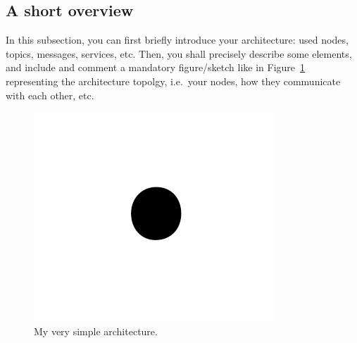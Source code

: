\documentclass[conference]{IEEEtran}
\begin{document}
\subsection{A short overview}
In this subsection, you can first briefly introduce your architecture: used nodes, topics, messages,
services, etc. Then, you shall precisely describe some elements, and include and comment a mandatory
figure/sketch like in Figure~\ref{fig:architecture} representing the architecture topolgy, i.e.\
your nodes, how they communicate with each other, etc.
%
\begin{figure}[htbp]
    \centerline{\includegraphics{fig1.png}}
    \caption{My very simple architecture.}
    \label{fig:architecture}
\end{figure}
%
\end{document}
